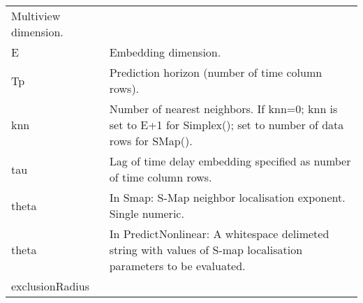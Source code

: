 \documentclass[]{article}
\begin{document}
\begin{longtable}[]{@{}ll@{}}
\begin{minipage}[t]{0.85\columnwidth}
Multiview dimension.\strut
\end{minipage}\tabularnewline
\begin{minipage}[t]{0.09\columnwidth}\raggedright
E\strut
\end{minipage} & \begin{minipage}[t]{0.85\columnwidth}\raggedright
Embedding dimension.\strut
\end{minipage}\tabularnewline
\begin{minipage}[t]{0.09\columnwidth}\raggedright
Tp\strut
\end{minipage} & \begin{minipage}[t]{0.85\columnwidth}\raggedright
Prediction horizon (number of time column rows).\strut
\end{minipage}\tabularnewline
\begin{minipage}[t]{0.09\columnwidth}\raggedright
knn\strut
\end{minipage} & \begin{minipage}[t]{0.85\columnwidth}\raggedright
Number of nearest neighbors. If knn=0; knn is set to E+1 for Simplex();
set to number of data rows for SMap().\strut
\end{minipage}\tabularnewline
\begin{minipage}[t]{0.09\columnwidth}\raggedright
tau\strut
\end{minipage} & \begin{minipage}[t]{0.85\columnwidth}\raggedright
Lag of time delay embedding specified as number of time column
rows.\strut
\end{minipage}\tabularnewline
\begin{minipage}[t]{0.09\columnwidth}\raggedright
theta\strut
\end{minipage} & \begin{minipage}[t]{0.85\columnwidth}\raggedright
In Smap: S-Map neighbor localisation exponent. Single numeric.\strut
\end{minipage}\tabularnewline
\begin{minipage}[t]{0.09\columnwidth}\raggedright
theta\strut
\end{minipage} & \begin{minipage}[t]{0.85\columnwidth}\raggedright
In PredictNonlinear: A whitespace delimeted string with values of S-map
localisation parameters to be evaluated.\strut
\end{minipage}\tabularnewline
\begin{minipage}[t]{0.09\columnwidth}\raggedright
exclusionRadius\strut
\end{minipage} & \begin{minipage}[t]{0.85\columnwidth}\raggedright

\end{minipage}
\end{longtable}
\end{document}
